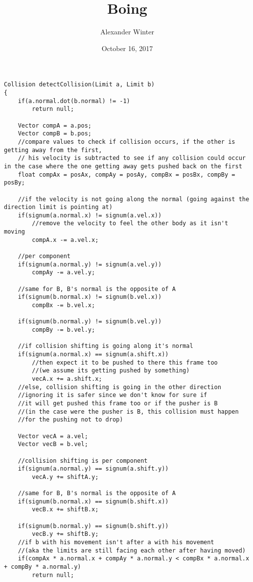 \documentclass[12pt]{article}
\title{Boing}
\author{Alexander Winter}
\date{October 16, 2017}
\begin{document}
\maketitle
	
\newpage

\begin{lstlisting}
Collision detectCollision(Limit a, Limit b)
{
	if(a.normal.dot(b.normal) != -1)
		return null;
	
	Vector compA = a.pos;
	Vector compB = b.pos;
	//compare values to check if collision occurs, if the other is getting away from the first,
	// his velocity is subtracted to see if any collision could occur in the case where the one getting away gets pushed back on the first
	float compAx = posAx, compAy = posAy, compBx = posBx, compBy = posBy;

	//if the velocity is not going along the normal (going against the direction limit is pointing at)
	if(signum(a.normal.x) != signum(a.vel.x))
		//remove the velocity to feel the other body as it isn't moving
		compA.x -= a.vel.x;

	//per component
	if(signum(a.normal.y) != signum(a.vel.y))
		compAy -= a.vel.y;

	//same for B, B's normal is the opposite of A
	if(signum(b.normal.x) != signum(b.vel.x))
		compBx -= b.vel.x;

	if(signum(b.normal.y) != signum(b.vel.y))
		compBy -= b.vel.y;

	//if collision shifting is going along it's normal
	if(signum(a.normal.x) == signum(a.shift.x))
		//then expect it to be pushed to there this frame too
		//(we assume its getting pushed by something)
		vecA.x += a.shift.x;
	//else, collision shifting is going in the other direction
	//ignoring it is safer since we don't know for sure if
	//it will get pushed this frame too or if the pusher is B
	//(in the case were the pusher is B, this collision must happen
	//for the pushing not to drop)
	
	Vector vecA = a.vel;
	Vector vecB = b.vel;
	
	//collision shifting is per component
	if(signum(a.normal.y) == signum(a.shift.y))
		vecA.y += shiftA.y;

	//same for B, B's normal is the opposite of A
	if(signum(b.normal.x) == signum(b.shift.x))
		vecB.x += shiftB.x;

	if(signum(b.normal.y) == signum(b.shift.y))
		vecB.y += shiftB.y;
	//if b with his movement isn't after a with his movement
	//(aka the limits are still facing each other after having moved)
	if(compAx * a.normal.x + compAy * a.normal.y < compBx * a.normal.x + compBy * a.normal.y)
		return null;


\end{lstlisting}
\end{document}
